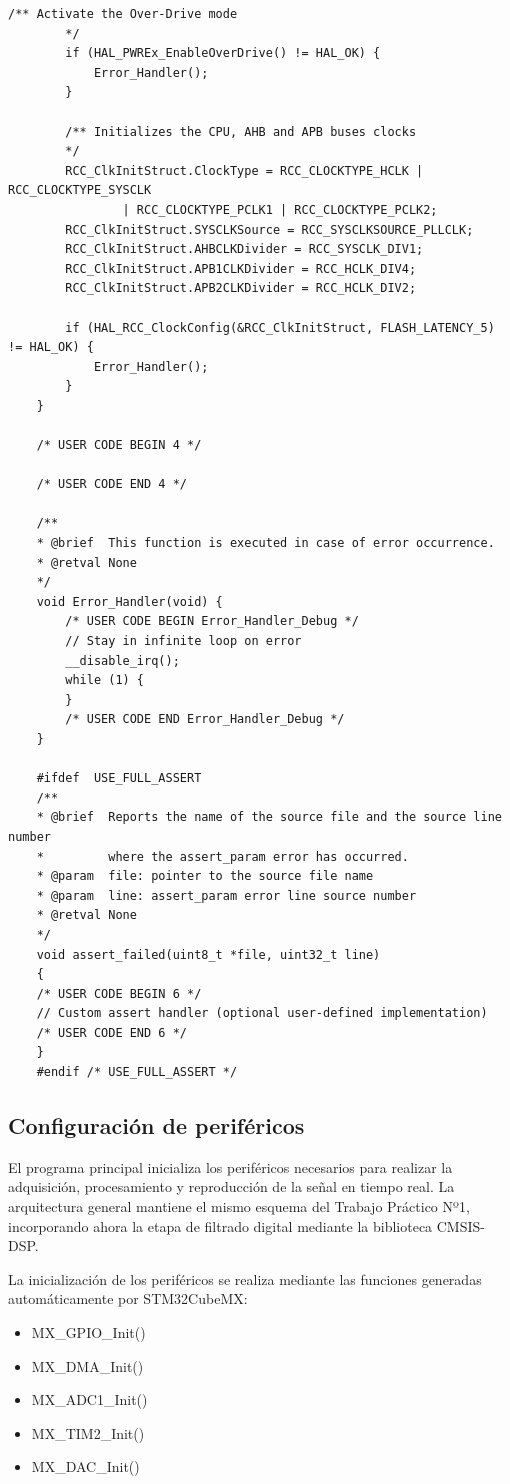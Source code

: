 \documentclass[12pt]{article}
\begin{document}
\begin{lstlisting}[style=mystyle]
		/** Activate the Over-Drive mode
		*/
		if (HAL_PWREx_EnableOverDrive() != HAL_OK) {
			Error_Handler();
		}

		/** Initializes the CPU, AHB and APB buses clocks
		*/
		RCC_ClkInitStruct.ClockType = RCC_CLOCKTYPE_HCLK | RCC_CLOCKTYPE_SYSCLK
				| RCC_CLOCKTYPE_PCLK1 | RCC_CLOCKTYPE_PCLK2;
		RCC_ClkInitStruct.SYSCLKSource = RCC_SYSCLKSOURCE_PLLCLK;
		RCC_ClkInitStruct.AHBCLKDivider = RCC_SYSCLK_DIV1;
		RCC_ClkInitStruct.APB1CLKDivider = RCC_HCLK_DIV4;
		RCC_ClkInitStruct.APB2CLKDivider = RCC_HCLK_DIV2;

		if (HAL_RCC_ClockConfig(&RCC_ClkInitStruct, FLASH_LATENCY_5) != HAL_OK) {
			Error_Handler();
		}
	}

	/* USER CODE BEGIN 4 */

	/* USER CODE END 4 */

	/**
	* @brief  This function is executed in case of error occurrence.
	* @retval None
	*/
	void Error_Handler(void) {
		/* USER CODE BEGIN Error_Handler_Debug */
		// Stay in infinite loop on error
		__disable_irq();
		while (1) {
		}
		/* USER CODE END Error_Handler_Debug */
	}

	#ifdef  USE_FULL_ASSERT
	/**
	* @brief  Reports the name of the source file and the source line number
	*         where the assert_param error has occurred.
	* @param  file: pointer to the source file name
	* @param  line: assert_param error line source number
	* @retval None
	*/
	void assert_failed(uint8_t *file, uint32_t line)
	{
	/* USER CODE BEGIN 6 */
	// Custom assert handler (optional user-defined implementation)
	/* USER CODE END 6 */
	}
	#endif /* USE_FULL_ASSERT */

	\end{lstlisting}

	\subsection{Configuración de periféricos}
	El programa principal inicializa los periféricos necesarios para realizar la adquisición, procesamiento y reproducción de la señal en tiempo real. La arquitectura general mantiene el mismo esquema del Trabajo Práctico Nº1, incorporando ahora la etapa de filtrado digital mediante la biblioteca CMSIS-DSP.

	La inicialización de los periféricos se realiza mediante las funciones generadas automáticamente por STM32CubeMX:

	\begin{itemize}
	\item MX\_GPIO\_Init()
	\item MX\_DMA\_Init()
	\item MX\_ADC1\_Init()
	\item MX\_TIM2\_Init()
	\item MX\_DAC\_Init()
	\end{itemize}
\end{document}
